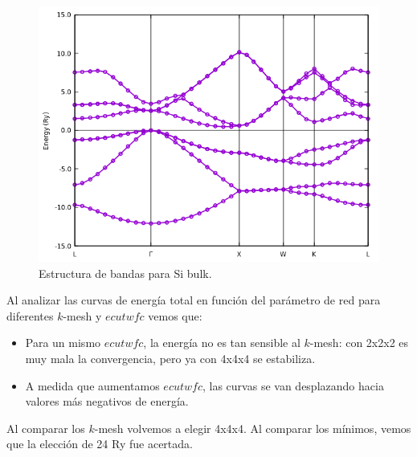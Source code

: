     \begin{figure}[H]
        \centering
        \includegraphics[scale = 0.6]{figs/D2/Si_bands.png}
        \caption{Estructura de bandas para Si bulk.}
    \end{figure}

  Al analizar las curvas de energía total en función del parámetro de red para diferentes $k$-mesh y $ecutwfc$ vemos que:
    \begin{itemize}
      \item Para un mismo $ecutwfc$, la energía no es tan sensible al $k$-mesh: con 2x2x2 es muy mala la convergencia, pero ya con 4x4x4 se estabiliza.
      \item A medida que aumentamos $ecutwfc$, las curvas se van desplazando hacia valores más negativos de energía.
    \end{itemize}

  Al comparar los $k$-mesh volvemos a elegir 4x4x4. Al comparar los mínimos, vemos que la elección de 24 Ry fue acertada.

